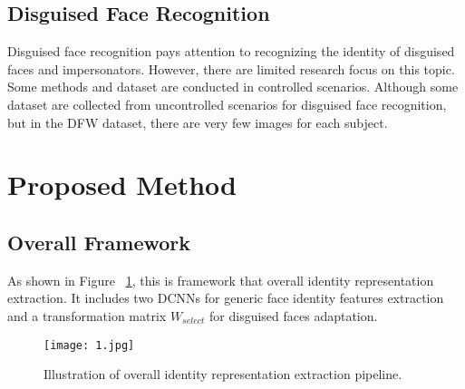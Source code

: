 \documentclass[10pt,twocolumn,letterpaper]{article}
\begin{document}
\subsection{Disguised Face Recognition}

Disguised face recognition pays attention to recognizing the identity of disguised faces and impersonators. However, there are limited research focus on this topic. Some methods and dataset are conducted in controlled scenarios. Although some dataset are collected from uncontrolled scenarios for disguised face recognition, but in the DFW dataset, there are very few images for each subject.

\section{Proposed Method}

\subsection{Overall Framework}

As shown in Figure ~\ref{fig:onecol}, this is framework that overall identity representation extraction. It includes two DCNNs for generic face identity features extraction and a transformation matrix $W_{select}$ for disguised faces adaptation.



\begin{figure}[!htpb]
\begin{center}
   \texttt{[image: 1.jpg]}
\end{center}
   \caption{Illustration of overall identity representation extraction pipeline.}
\label{fig:onecol}
\end{figure}

{\small


}
\end{document}
